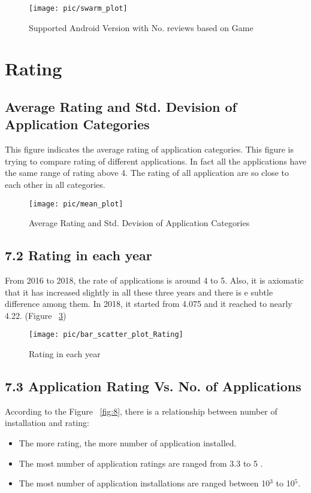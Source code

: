 \begin{figure}
\centering
\texttt{[image: pic/swarm\_plot]}
\caption{Supported Android Version with No. reviews based on Game}
\label{fig:5}
\end{figure}

\section*{Rating}
\subsection*{Average Rating and Std. Devision of Application Categories}
This figure indicates the average rating of application categories. This figure is trying to compare rating of different applications. In fact all the applications have the same range of rating above 4. The rating of all application are so close to each other in all categories.
\begin{figure}
\centering
\texttt{[image: pic/mean\_plot]}
\caption{Average Rating and Std. Devision of Application Categories} 
\label{fig:6}
\end{figure}

\subsection*{7.2 Rating in each year}
From 2016 to 2018, the rate of applications is around 4 to 5. Also, it is axiomatic that it has increased slightly in all these three years and there is e subtle difference among them. In 2018, it started from 4.075 and it reached to nearly 4.22. (Figure ~\ref{fig:7})
\begin{figure}
\centering
\texttt{[image: pic/bar\_scatter\_plot\_Rating]}
\caption{Rating in each year} 
\label{fig:7}
\end{figure}

\subsection*{7.3 Application Rating Vs. No. of Applications }
According to the Figure ~\ref{fig:8}, there is a relationship between number of installation and rating:
\begin{itemize}
\item The more rating, the more number of application installed.\\
\item The most number of application ratings are ranged from 3.3 to 5 .\\
\item The most number of application installations are ranged between 10$^{3}$  to 10$^{5}$.\\
\end{itemize}

